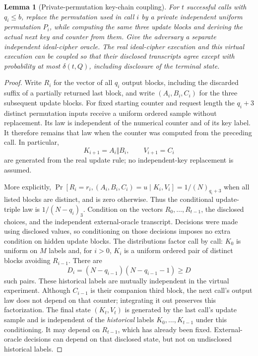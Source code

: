\documentclass[11 pt,a 4 paper]{article}
\newtheorem{lemma}[theorem]{Lemma}
\begin{document}
\begin{lemma}[Private-permutation key-chain coupling]\label{lem:chain}
For $ t $ successful calls with $ q_i\leq b $, replace the permutation used in call $ i $ by a private independent uniform permutation $ P_i $, while computing \emph{the same} three update blocks and deriving the actual next key and counter from them. Give the adversary a separate independent ideal-cipher oracle. The real ideal-cipher execution and this virtual execution can be coupled so that their disclosed transcripts agree except with probability at most $\delta(t,Q)$, including disclosure of the terminal state.
\end{lemma}
\begin{proof}
Write $ R_i $ for the vector of all $ q_i $ output blocks, including the discarded suffix of a partially returned last block, and write $(A_i,B_i,C_i)$ for the three subsequent update blocks. For fixed starting counter and request length the $ q_i+3$ distinct permutation inputs receive a uniform ordered sample without replacement. Its law is independent of the numerical counter and of its key label. It therefore remains that law when the counter was computed from the preceding call. In particular,
\[
 K_{i+1}=A_i\Vert B_i,\qquad V_{i+1}=C_i
\]
are generated from the real update rule; no independent-key replacement is assumed.

More explicitly, $\Pr[R_i=r_i,(A_i,B_i,C_i)=u\mid K_i,V_i]=1/(N)_{q_i+3}$ when all listed blocks are distinct, and is zero otherwise. Thus the conditional update-triple law is $1/(N-q_i)_3$. Condition on the vectors $ R_0,\ldots,R_{t-1}$, the disclosed choices, and the independent external-oracle transcript. Decisions were made using disclosed values, so conditioning on those decisions imposes no extra condition on hidden update blocks. The distributions factor call by call: $ K_0$ is uniform on $ M $ labels and, for $ i>0$, $ K_i $ is a uniform ordered pair of distinct blocks avoiding $ R_{i-1}$. There are
\[
 D_i=(N-q_{i-1})(N-q_{i-1}-1)\geq D
\]
such pairs. These historical labels are mutually independent in the virtual experiment. Although $ C_{i-1}$ is their companion third block, the next call's output law does not depend on that counter; integrating it out preserves this factorization. The final state $(K_t,V_t)$ is generated by the last call's update sample and is independent of the \emph{historical} labels $ K_0,\ldots,K_{t-1}$ under this conditioning. It may depend on $ R_{t-1}$, which has already been fixed. External-oracle decisions can depend on that disclosed state, but not on undisclosed historical labels.


\end{proof}
\end{document}
